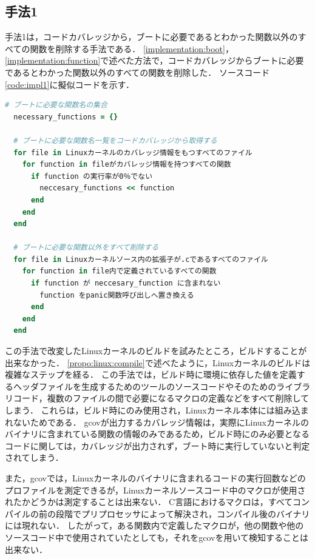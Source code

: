 \documentclass[graduation-thesis]{mlarticle}
\begin{document}
\subsection{手法1}
\label{implementation:1}

手法1は，コードカバレッジから，ブートに必要であるとわかった関数以外のすべての関数を削除する手法である．
\ref{implementation:boot}，\ref{implementation:function}で述べた方法で，コードカバレッジからブートに必要であるとわかった関数以外のすべての関数を削除した．
ソースコード\ref{code:impl1}に擬似コードを示す．

\begin{lstlisting}[language=ruby, caption=手法1の擬似コード, label=code:impl1]
  # ブートに必要な関数名の集合
  necessary_functions = {}

  # ブートに必要な関数名一覧をコードカバレッジから取得する
  for file in Linuxカーネルのカバレッジ情報をもつすべてのファイル
    for function in fileがカバレッジ情報を持つすべての関数
      if function の実行率が0％でない
        neccesary_functions << function
      end
    end
  end

  # ブートに必要な関数以外をすべて削除する
  for file in Linuxカーネルソース内の拡張子が.cであるすべてのファイル
    for function in file内で定義されているすべての関数 
      if function が neccesary_function に含まれない
        function をpanic関数呼び出しへ置き換える
      end
    end
  end
\end{lstlisting}

この手法で改変したLinuxカーネルのビルドを試みたところ，ビルドすることが出来なかった．
\ref{propo:linux:compile}で述べたように，Linuxカーネルのビルドは複雑なステップを経る．
この手法では，ビルド時に環境に依存した値を定義するヘッダファイルを生成するためのツールのソースコードやそのためのライブラリコード，複数のファイルの間で必要になるマクロの定義などをすべて削除してしまう．
これらは，ビルド時にのみ使用され，Linuxカーネル本体には組み込まれないためである．
gcovが出力するカバレッジ情報は，実際にLinuxカーネルのバイナリに含まれている関数の情報のみであるため，ビルド時にのみ必要となるコードに関しては，カバレッジが出力されず，ブート時に実行していないと判定されてしまう．

また，gcovでは，Linuxカーネルのバイナリに含まれるコードの実行回数などのプロファイルを測定できるが，Linuxカーネルソースコード中のマクロが使用されたかどうかは測定することは出来ない．
C言語におけるマクロは，すべてコンパイルの前の段階でプリプロセッサによって解決され，コンパイル後のバイナリには現れない．
したがって，ある関数内で定義したマクロが，他の関数や他のソースコード中で使用されていたとしても，それをgcovを用いて検知することは出来ない．
\end{document}
